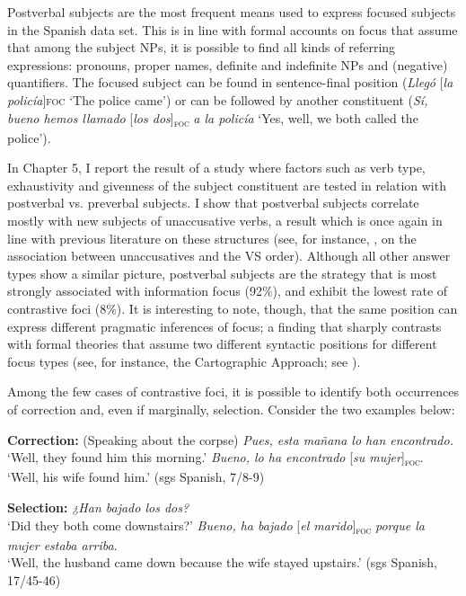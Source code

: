 Postverbal subjects are the most frequent means used to express focused subjects in the Spanish data set. This is in line with formal accounts on focus that assume that among the subject NPs, it is possible to find all kinds of referring expressions: pronouns, proper names, definite and indefinite NPs and (negative) quantifiers. The focused subject can be found in sentence-final position ({\textit{Llegó} {[\textit{la policía}]}\textsc{foc}} \normalsize `The police came')  or can be followed by another constituent ({\textit{Sí, bueno hemos llamado} {[\textit{los dos}}]\textsubscript{\textsc{foc}}} \normalsize \textit{a la policía} `Yes, well, we both called the police').

In Chapter 5, I report the result of a study where factors such as verb type, exhaustivity and givenness of the subject constituent are tested in relation with postverbal vs. preverbal subjects. I show that postverbal subjects correlate mostly with new subjects of unaccusative verbs, a result which is once again in line with previous literature on these structures (see, for instance, \cite{burzio1986italian}, on the association between unaccusatives and the VS order). 
Although all other answer types show a similar picture, postverbal subjects are the strategy that is most strongly associated with information focus (92\%), and exhibit the lowest rate of contrastive foci (8\%). It is interesting to note, though, that the same position can express different pragmatic inferences of focus; a finding that sharply contrasts with formal theories that assume two different syntactic positions for different focus types (see, for instance, the Cartographic Approach; see \cite{rizzi1997fine}). 

Among the few cases of contrastive foci, it is possible to identify both occurrences of correction and, even if marginally, selection. Consider the two examples below:

 \ea \label{ex:3:56} \textbf{Correction:}
 (Speaking about the corpse)
\ea \textit{Pues, esta mañana lo han encontrado.}\\
 ‘Well, they found him this morning.'
 \textit{Bueno, lo ha encontrado} {[\textit{su mujer}]\textsubscript{\textsc{foc}}}\normalsize.\\
‘Well, his wife found him.' \hfill (sgs Spanish, 7/8-9)   
\z \z 

 \ea \label{ex:3:57} \textbf{Selection:}
\ea \textit{¿Han bajado los dos?}\\
 ‘Did they both come downstairs?'
\ex \textit{Bueno, ha bajado} {[\textit{el marido}]\textsubscript{\textsc{foc}}} \normalsize \textit{porque la mujer estaba arriba}.\\
‘Well, the husband came down because the wife stayed upstairs.' \hfill (sgs Spanish, 17/45-46)   
\z \z 



